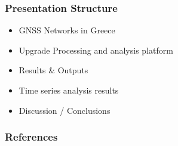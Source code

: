 \documentclass[aspectratio=169, customfont, printbib]{Classes/beamerPub}%
\begin{document}
\maketitle

\begin{frame}
  \frametitle{Presentation Structure}
    \begin{itemize}\setlength\itemsep{1em}
        \item GNSS Networks in Greece
        \item Upgrade Processing and analysis platform
        \item Results \& Outputs
        \item Time series analysis results
        \item Discussion / Conclusions
      \end{itemize}
\end{frame}





\makethanku %

\ifdefinePrintbib
  \begin{frame}[t,allowframebreaks]
    \frametitle{References}
    \printbibliography
  \end{frame}
\fi

% 


\end{document}
